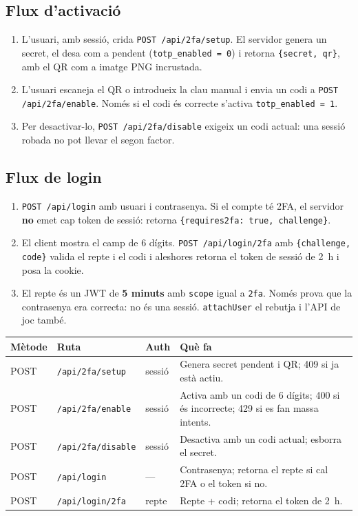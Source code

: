 \documentclass[10pt,a4paper]{article}
\begin{document}
\subsection*{Flux d'activació}

\begin{enumerate}[nosep]
  \item L'usuari, amb sessió, crida \texttt{POST /api/2fa/setup}. El servidor genera
        un secret, el desa com a pendent (\texttt{totp\_enabled = 0}) i retorna
        \texttt{\{secret, qr\}}, amb el QR com a imatge PNG incrustada.
  \item L'usuari escaneja el QR o introdueix la clau manual i envia un codi a
        \texttt{POST /api/2fa/enable}. Només si el codi és correcte s'activa
        \texttt{totp\_enabled = 1}.
  \item Per desactivar-lo, \texttt{POST /api/2fa/disable} exigeix un codi actual: una
        sessió robada no pot llevar el segon factor.
\end{enumerate}

\subsection*{Flux de login}

\begin{enumerate}[nosep]
  \item \texttt{POST /api/login} amb usuari i contrasenya. Si el compte té 2FA, el
        servidor \textbf{no} emet cap token de sessió: retorna
        \texttt{\{requires2fa: true, challenge\}}.
  \item El client mostra el camp de 6 dígits. \texttt{POST /api/login/2fa} amb
        \texttt{\{challenge, code\}} valida el repte i el codi i aleshores retorna el
        token de sessió de 2~h i posa la cookie.
  \item El repte és un JWT de \textbf{5 minuts} amb \texttt{scope} igual a
        \texttt{2fa}. Només prova que la contrasenya era correcta: no és una sessió.
        \texttt{attachUser} el rebutja i l'API de joc també.
\end{enumerate}

\begin{table}[ht]
\small
\begin{tabularx}{\textwidth}{@{}p{2.1cm}p{4.2cm}p{1.2cm}X@{}}
\toprule
\textbf{Mètode} & \textbf{Ruta} & \textbf{Auth} & \textbf{Què fa} \\
\midrule
POST & \texttt{/api/2fa/setup} & sessió & Genera secret pendent i QR; 409 si ja està
actiu. \\
POST & \texttt{/api/2fa/enable} & sessió & Activa amb un codi de 6 dígits; 400 si és
incorrecte; 429 si es fan massa intents. \\
POST & \texttt{/api/2fa/disable} & sessió & Desactiva amb un codi actual; esborra el
secret. \\
POST & \texttt{/api/login} & --- & Contrasenya; retorna el repte si cal 2FA o el token
si no. \\
POST & \texttt{/api/login/2fa} & repte & Repte + codi; retorna el token de 2~h. \\
\bottomrule
\end{tabularx}
\end{table}
\end{document}
